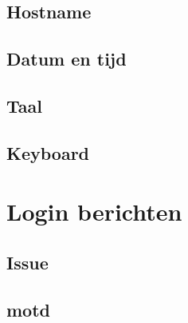\documentclass[a4paper,12pt,twoside,openright,titlepage]{book}
\begin{document}
\subsection{Hostname}
\subsection{Datum en tijd}

\subsection{Taal}

\subsection{Keyboard}


\section{Login berichten}
\subsection{Issue}

\subsection{motd}


\printindex
\end{document}
